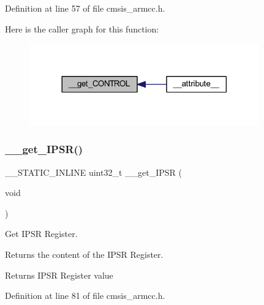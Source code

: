 Definition at line 57 of file cmsis\+\_\+armcc.\+h.

Here is the caller graph for this function\+:
\nopagebreak
\begin{figure}[H]
\begin{center}
\leavevmode
\includegraphics[width=281pt]{group___c_m_s_i_s___core___reg_acc_functions_ga5fe64567d5bf0a81c118374e9a3a4598_icgraph}
\end{center}
\end{figure}
\mbox{\label{group___c_m_s_i_s___core___reg_acc_functions_ga2c18685a915eb9b7513a907c2b866636}} 
\subsubsection{\texorpdfstring{\+\_\+\+\_\+get\+\_\+\+I\+P\+S\+R()}{\_\_get\_IPSR()}}
{\footnotesize\ttfamily \+\_\+\+\_\+\+S\+T\+A\+T\+I\+C\+\_\+\+I\+N\+L\+I\+NE uint32\+\_\+t \+\_\+\+\_\+get\+\_\+\+I\+P\+SR (\begin{DoxyParamCaption}\item[{void}]{ }\end{DoxyParamCaption})}



Get I\+P\+SR Register. 

Returns the content of the I\+P\+SR Register. \begin{DoxyReturn}{Returns}
I\+P\+SR Register value 
\end{DoxyReturn}


Definition at line 81 of file cmsis\+\_\+armcc.\+h.

